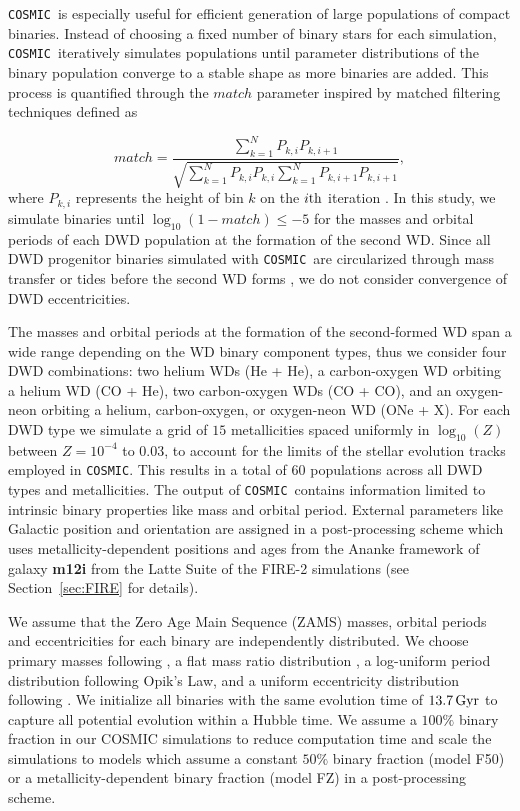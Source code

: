 \documentclass[twocolumn, linenumbers]{aastex631}
\newcommand{\cosmic}{\texttt{COSMIC}}
\begin{document}
\cosmic\ is especially useful for efficient generation of large populations of compact binaries. Instead of choosing a fixed number of binary stars for each simulation, \cosmic\ iteratively simulates populations until parameter distributions of the binary population converge to a stable shape as more binaries are added. This process is quantified through the $match$ parameter inspired by matched filtering techniques \citep[e.g. Eq. 6 of ][]{Chatziioannou2017} defined as

\begin{equation}
   match = \frac{\sum_{k=1}^{N}P_{k,i}P_{k,i+1}}{\sqrt{\sum_{k=1}^{N}P_{k,i}P_{k,i}\sum_{k=1}^{N}P_{k,i+1}P_{k,i+1}}},
\end{equation}
where $P_{k,i}$ represents the height of bin $k$ on the $i\rm{th}$ iteration \citep{Breivik2020a}. In this study, we simulate binaries until $\log_{10}(1-match) \leq -5$ for the masses and orbital periods of each DWD population at the formation of the second WD. Since all DWD progenitor binaries simulated with \cosmic\ are circularized through mass transfer or tides before the second WD forms \citep[e.g.][]{Marsh2004, Gokhale2007, Sepinsky2014, Kremer2015}, we do not consider convergence of DWD eccentricities.


The masses and orbital periods at the formation of the second-formed WD span a wide range depending on the WD binary component types, thus we consider four DWD combinations: two helium WDs (He + He), a carbon-oxygen WD orbiting a helium WD (CO + He), two carbon-oxygen WDs (CO + CO), and an oxygen-neon orbiting a helium, carbon-oxygen, or oxygen-neon WD (ONe + X). For each DWD type we simulate a grid of $15$ metallicities spaced uniformly in $\log_{10}(Z)$ between $Z=10^{-4}$ to $0.03$, to account for the limits of the \citet{Hurley2000} stellar evolution tracks employed in \cosmic. This results in a total of $60$ populations across all DWD types and metallicities. The output of \cosmic\ contains information limited to intrinsic binary properties like mass and orbital period. External parameters like Galactic position and orientation are assigned in a post-processing scheme which uses metallicity-dependent positions and ages from the Ananke framework of galaxy \textbf{m12i} from the Latte Suite of the FIRE-2 simulations (see Section~\ref{sec:FIRE} for details).


We assume that the Zero Age Main Sequence (ZAMS) masses, orbital periods and eccentricities for each binary are independently distributed. We choose primary masses following \citet{Kroupa2001}, a flat mass ratio distribution \citep{Mazeh1992, Goldberg1994}, a log-uniform period distribution following Opik's Law, and a uniform eccentricity distribution following \cite{Geller2019}. We initialize all binaries with the same evolution time of $13.7\,\rm{Gyr}$ to capture all potential evolution within a Hubble time. We assume a $100\%$ binary fraction in our COSMIC simulations to reduce computation time and scale the simulations to models which assume a constant $50\%$ binary fraction (model F50) or a metallicity-dependent binary fraction (model FZ) in a post-processing scheme. 
\end{document}

